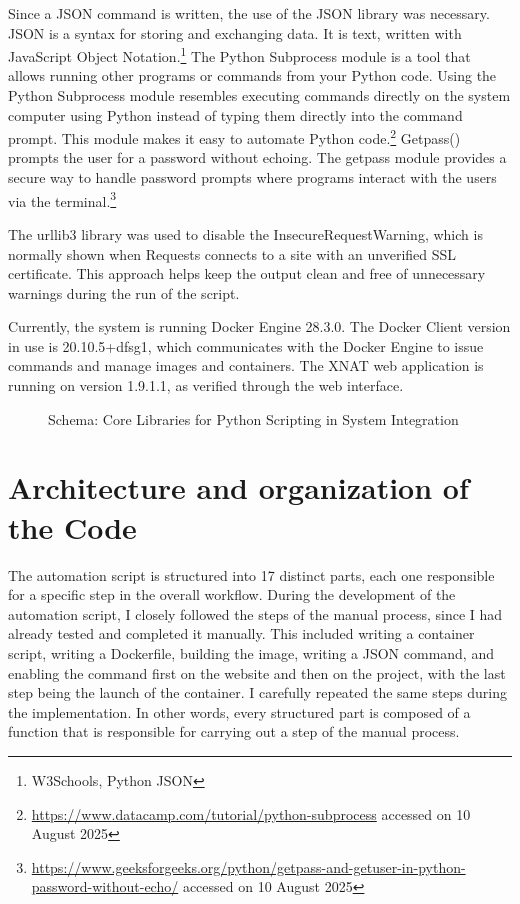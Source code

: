 Since a JSON command is written, the use of the JSON library was necessary. JSON is a syntax for storing and exchanging data. It is text, written with JavaScript Object Notation.\footnote{W3Schools, Python JSON}
The Python Subprocess module is a tool that allows running other programs or commands from your Python code. Using the Python Subprocess module resembles executing commands directly on the system computer using Python instead of typing them directly into the command prompt. This module makes it easy to automate Python code.\footnote{\url{https://www.datacamp.com/tutorial/python-subprocess} accessed on 10 August 2025}
Getpass() prompts the user for a password without echoing. The getpass module provides a secure way to handle password prompts where programs interact with the users via the terminal.\footnote{\url{https://www.geeksforgeeks.org/python/getpass-and-getuser-in-python-password-without-echo/} accessed on 10 August 2025}

The urllib3 library was used to disable the InsecureRequestWarning, which is normally shown when Requests connects to a site with an unverified SSL certificate. This approach helps keep the output clean and free of unnecessary warnings during the run of the script.

Currently, the system is running Docker Engine 28.3.0. The Docker Client version in use is 20.10.5+dfsg1, which communicates with the Docker Engine to issue commands and manage images and containers. The XNAT web application is running on version 1.9.1.1, as verified through the web interface.


\begin{figure}[ht]
  \centering
  \def\svgwidth{0.8\linewidth}
  
  \caption{Schema: Core Libraries for Python Scripting in System Integration}
  \label{fig:diagram-core-libraries}
\end{figure}





\section{Architecture and organization of the Code}
The automation script is structured into 17 distinct parts, each one responsible for a specific step in the overall workflow.
During the development of the automation script, I closely followed the steps of the manual process, since I had already tested and completed it manually. This included writing a container script, writing a Dockerfile, building the image, writing a JSON command, and enabling the command first on the website and then on the project, with the last step being the launch of the container. I carefully repeated the same steps during the implementation. In other words, every structured part is composed of a function that is responsible for carrying out a step of the manual process.
 
